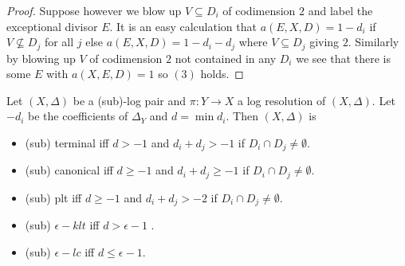 \begin{proof}
	 Suppose however we blow up $V\subseteq D_{i}$ of codimension $2$ and label the exceptional divisor $E$. It is an easy calculation that $a(E,X,D)=1-d_{i}$ if $V\not\subseteq D_{j}$ for all $j$ else $a(E,X,D)=1-d_{i}-d_{j}$ where $V \subseteq D_{j}$ giving $2$. Similarly by blowing up $V$ of codimension $2$ not contained in any $D_{i}$ we see that there is some $E$ with $a(X,E,D)=1$ so $(3)$ holds.
	 
\end{proof}






\begin{corollary}
	Let $(X,\Delta)$ be a (sub)-log pair and $\pi\colon Y\to X$ a log resolution of $(X,\Delta)$. Let $-d_{i}$ be the coefficients of $\Delta_{Y}$ and $d=\min d_{i}.$
	Then $(X,\Delta)$ is
	\begin{itemize}
		\item 	(sub) terminal iff $d > -1$ and $d_{i}+d_{j} > -1$ if $D_{i} \cap D_{j} \neq \emptyset$.
		\item	(sub) canonical iff $d \geq -1$ and $d_{i}+d_{j} \geq - 1$ if $D_{i} \cap D_{j} \neq \emptyset$. 
		\item 	(sub) plt iff $d \geq -1$ and $d_{i}+d_{j} > -2$ if $D_{i} \cap D_{j} \neq \emptyset$.
		\item	(sub) $\epsilon-klt$ iff $d > \epsilon-1$ .
		\item	(sub) $\epsilon-lc$ iff $d \leq \epsilon-1$.
	\end{itemize}
\end{corollary}


